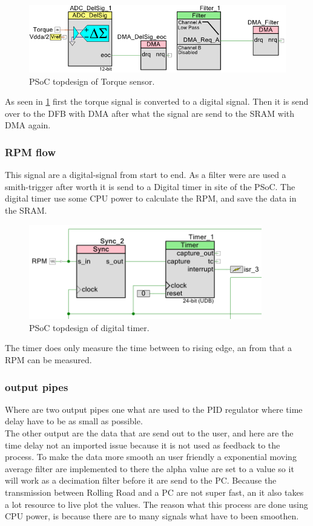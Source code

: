 \begin{figure}[H]
	\centering
	\includegraphics [width=6in]{Software/Pictures/ADC_DelSig_topdesign.png}
	\caption{PSoC topdesign of Torque sensor.}
	\label{fig:ADC_delsig_topdesign}
\end{figure}

As seen in \ref{fig:ADC_delsig_topdesign} first the torque signal is converted to a digital signal. Then it is send over to the DFB with DMA after what the signal are send to the SRAM with DMA again. 

\subsubsection{RPM flow}

This signal are a digital-signal from start to end. As a filter were are used a smith-trigger after worth it is send to a Digital timer in site of the PSoC. The digital timer use some CPU power to calculate the RPM, and save the data in the SRAM.

\begin{figure}[H]
	\centering
	\includegraphics [width=4in]{Software/Pictures/RPM_sensor_topdesign.PNG}
	\caption{PSoC topdesign of digital timer.}
	\label{fig:digital_timer_topdesign}
\end{figure}

The timer does only measure the time between to rising edge, an from that a RPM can be measured. 

\subsubsection{output pipes}

Where are two output pipes one what are used to the PID regulator where time delay have to be as small as possible.\\
The other output are the data that are send out to the user, and here are the time delay not an imported issue because it is not used as feedback to the process. To make the data more smooth an user friendly a exponential moving average filter are implemented to there the alpha value are set to a value so it will work as a decimation filter before it are send to the PC. Because the transmission between Rolling Road and a PC are not super fast, an it also takes a lot resource to live plot the values. The reason what this process are done using CPU power, is because there are to many signals what have to been smoothen.


